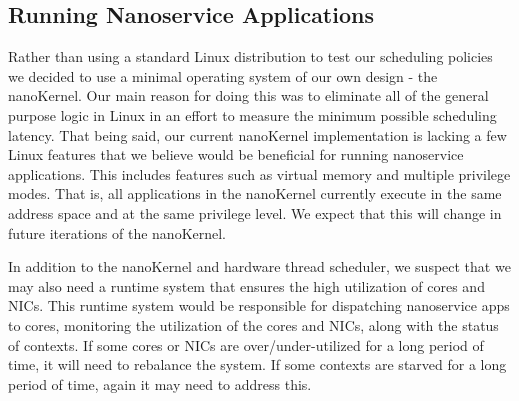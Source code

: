 \subsection{Running Nanoservice Applications}
Rather than using a standard Linux distribution to test our scheduling policies we decided to use a minimal operating system of our own design - the nanoKernel.
Our main reason for doing this was to eliminate all of the general purpose logic in Linux in an effort to measure the minimum possible scheduling latency.
That being said, our current nanoKernel implementation is lacking a few Linux features that we believe would be beneficial for running nanoservice applications.
This includes features such as virtual memory and multiple privilege modes.
That is, all applications in the nanoKernel currently execute in the same address space and at the same privilege level.
We expect that this will change in future iterations of the nanoKernel.

In addition to the nanoKernel and hardware thread scheduler, we suspect that we may also need a runtime system that ensures the high utilization of \name{} cores and NICs.
This runtime system would be responsible for dispatching nanoservice apps to \name{} cores, monitoring the utilization of the cores and NICs, along with the status of contexts.
If some cores or NICs are over/under-utilized for a long period of time, it will need to rebalance the system.
If some contexts are starved for a long period of time, again it may need to address this.

